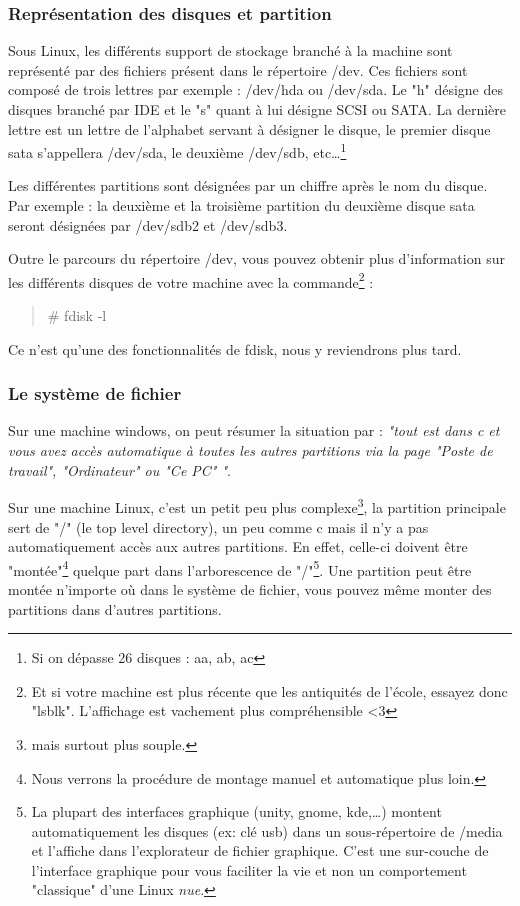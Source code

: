 \documentclass[a4paper,11pt]{article}
\newcommand{\commande}[1] {
    \begin{quote}
    \tt\raggedright #1 
    \end{quote}
}
\begin{document}
\subsubsection{Représentation des disques et partition}
\par Sous Linux, les différents support de stockage branché à la machine sont représenté par des fichiers présent dans le répertoire /dev. Ces fichiers sont composé de trois lettres par exemple : /dev/hda ou /dev/sda. Le "h" désigne des disques branché par IDE et le "s" quant à lui désigne SCSI ou SATA. La dernière lettre est un lettre de l'alphabet servant à désigner le disque, le premier disque sata s'appellera /dev/sda, le deuxième /dev/sdb, etc\dots\footnote{Si on dépasse 26 disques : aa, ab, ac}
\par Les différentes partitions sont désignées par un chiffre après le nom du disque. Par exemple : la deuxième et la troisième partition du deuxième disque sata seront désignées par /dev/sdb2 et /dev/sdb3.
\par Outre le parcours du répertoire /dev, vous pouvez obtenir plus d'information sur les différents disques de votre machine avec la commande\footnote{Et si votre machine est plus récente que les antiquités de l'école, essayez donc "lsblk". L'affichage est vachement plus compréhensible <3} :
\commande{\# fdisk -l}
\par Ce n'est qu'une des fonctionnalités de fdisk, nous y reviendrons plus tard.
 
\subsubsection{Le système de fichier}
\par Sur une machine windows, on peut résumer la situation par : \emph{"tout est dans c et vous avez accès automatique à toutes les autres partitions via la page "Poste de travail", "Ordinateur" ou "Ce PC" "}.
\par Sur une machine Linux, c'est un petit peu plus complexe\footnote{mais surtout plus souple.}, la partition principale sert de "/" (le top level directory), un peu comme c mais il n'y a pas automatiquement accès aux autres partitions. En effet, celle-ci doivent être "montée"\footnote{Nous verrons la procédure de montage manuel et automatique plus loin.} quelque part dans l'arborescence de "/"\footnote{La plupart des interfaces graphique (unity, gnome, kde,\dots) montent automatiquement les disques (ex: clé usb) dans un sous-répertoire de /media et l'affiche dans l'explorateur de fichier graphique. C'est une sur-couche de l'interface graphique pour vous faciliter la vie et non un comportement "classique" d'une Linux \emph{nue}.}. Une partition peut être montée n'importe où dans le système de fichier, vous pouvez même monter des partitions dans d'autres partitions.
\end{document}
